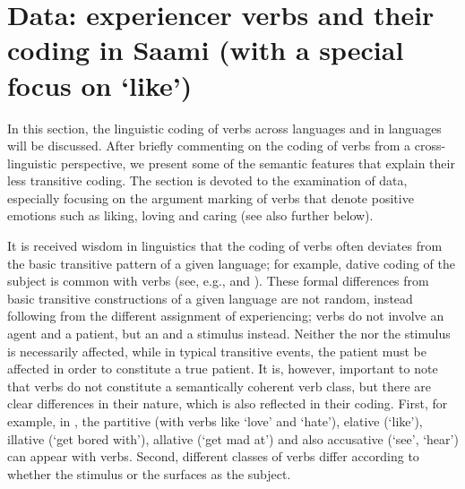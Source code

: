 \documentclass[output=paper]{LSP/langsci}
\begin{document}
\section{Data: experiencer verbs and their coding in Saami (with a special focus on ‘like’)}
\label{16-sec:3}

In this section, the linguistic coding of  verbs across languages and in  languages will be discussed. After briefly commenting on the coding of  verbs from a cross-linguistic perspective, we present some of the semantic features that explain their less transitive coding. The section is devoted to the examination of  data, especially focusing on the argument marking of verbs that denote positive emotions such as liking, loving and caring (see also  further below).

 It is received wisdom in linguistics that the coding of  verbs often deviates from the basic transitive pattern of a given language; for example, dative coding of the subject is common with  verbs (see, e.g., \citealt{Vermaetal1990Experiencer} and \citealt{Aikhenvaldetal2001Noncanonical}). These formal differences from basic transitive constructions of a given language are not random, instead following from the different  assignment of experiencing;  verbs do not involve an agent and a patient, but an  and a stimulus instead. Neither the  nor the stimulus is necessarily affected, while in typical transitive events, the patient must be affected in order to constitute a true patient. It is, however, important to note that  verbs do not constitute a semantically coherent verb class, but there are clear differences in their nature, which is also reflected in their coding. First, for example, in , the partitive (with verbs like ‘love’ and ‘hate’), elative (‘like’), illative (‘get bored with’), allative (‘get mad at’) and also accusative (‘see’, ‘hear’) can appear with  verbs. Second, different classes of  verbs differ according to whether the stimulus or the  surfaces as the subject.
\end{document}
